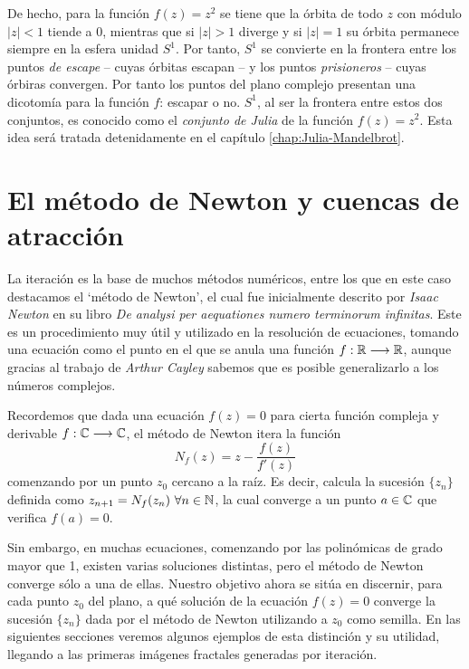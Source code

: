 De hecho, para la función $f(z)=z^2$ se tiene que la órbita de todo $z$ con módulo $|z|<1$ tiende a $0$, mientras que si $|z|>1$ diverge y si $|z|=1$ su órbita permanece siempre en la esfera unidad $S^1$. Por tanto, $S^1$ se convierte en la frontera entre los puntos \textit{de escape} -- cuyas órbitas escapan -- y los puntos \textit{prisioneros} -- cuyas órbiras convergen. Por tanto los puntos del plano complejo presentan una dicotomía para la función $f$: escapar o no. $S^1$, al ser la frontera entre estos dos conjuntos, es conocido como el \textit{conjunto de Julia} de la función $f(z)=z^2$. Esta idea será tratada detenidamente en el capítulo \ref{chap:Julia-Mandelbrot}.

\section{El método de Newton y cuencas de atracción}

La iteración es la base de muchos métodos numéricos, entre los que en este caso destacamos el `método de Newton', el cual fue inicialmente descrito por \textit{Isaac Newton} en su libro \textit{De analysi per aequationes numero terminorum infinitas}. Este es un procedimiento muy útil y utilizado en la resolución de ecuaciones, tomando una ecuación como el punto en el que se anula una función $f:\mathbb{R}\longrightarrow\mathbb{R}$, aunque gracias al trabajo de \textit{Arthur Cayley} sabemos que es posible generalizarlo a los números complejos.

Recordemos que dada una ecuación $f(z)=0$ para cierta función compleja y derivable $f:\mathbb{C}\longrightarrow\mathbb{C}$, el método de Newton itera la función
\begin{equation}
    \label{eq:metodo-Newton}
    N_f(z)=z-\frac{f(z)}{f'(z)}
\end{equation} 
comenzando por un punto $z_0$ cercano a la raíz. Es decir, calcula la sucesión $\{z_n\}$ definida como $z_{n+1}=N_f(z_n) \ \forall n\in\mathbb{N}$, la cual converge a un punto $a\in\mathbb{C}$ que verifica $f(a)=0$.

Sin embargo, en muchas ecuaciones, comenzando por las polinómicas de grado mayor que 1, existen varias soluciones distintas, pero el método de Newton converge sólo a una de ellas. Nuestro objetivo ahora se sitúa en discernir, para cada punto $z_0$ del plano, a qué solución de la ecuación $f(z)=0$ converge la sucesión $\{z_n\}$ dada por el método de Newton utilizando a $z_0$ como semilla. En las siguientes secciones veremos algunos ejemplos de esta distinción y su utilidad, llegando a las primeras imágenes fractales generadas por iteración.

